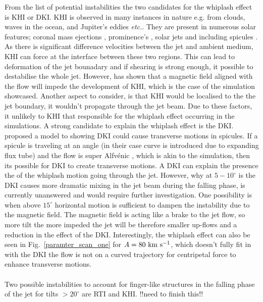 \documentclass[12pt]{ociamthesis}
\newcommand{\Alfvenic}{Alfv\'{e}nic }
\newcommand{\kms}{~\rm{km ~s^{-1}}}
\newcommand{\np}{\\ \\}
\newcommand{\degs}{^{\circ}}
\begin{document}
From the list of potential instabilities the two candidates for the whiplash effect is KHI or DKI. KHI is observed in many instances in nature e.g. from clouds, waves in the ocean, and Jupiter's eddies \textit{etc.}.  They are present in numerous solar features; coronal mass ejections \citep{Foullon2011ApJ729L8F, Foullon2013ApJ767170F}, prominence's \citep{Berger2010ApJ7161288B, Ryutova2010SoPh26775R}, solar jets \citep{Filippov2015MNRAS4511117F,Li2018NatSR88136L}  and including spicules \citep{Kuridze2016ApJ830133K, Antolin2018ApJ85644A}. As there is significant difference velocities between the jet and ambient medium, KHI can force at the interface between these two regions. This can lead to deformation of the jet bounadary and if shearing is strong enough, it possible to destabilise the whole jet. However,  \cite{Chandrasekhar1961hhsbookC} has shown that a magnetic field aligned with the flow will impede the development of KHI, which is the case of the simulation showcased. Another aspect to consider, is that KHI would be localised to the the jet boundary, it wouldn't propagate through the jet beam. Due to these factors, it unlikely to KHI that responsible for the whiplash effect occurring in the simulations. A strong candidate to explain the whiplash effect is the DKI. \cite{Zaqarashvili2020ApJ893L46Z} proposed a model to showing DKI could cause transverse motions in spicules. If a spicule is traveling at an angle (in their case curve is introduced due to expanding flux tube) and the flow is super \Alfvenic, which is akin to the simulation, then its possible for DKI to create transverse motions. A DKI can explain the presence the of the whiplash motion going through the jet. However, why at $5-10\degs$ is the DKI causes more dramatic mixing in the jet beam during the falling phase, is currently unanswered and would require further investigation. One possibility is when above $15^{\circ}$ horizontal motion is sufficient to dampen the instability due to the magnetic field. The magnetic field is acting like a brake to the jet flow, so more tilt the more impeded the jet will be therefore smaller up-flows and a reduction in the effect of the DKI. Interestingly, the whiplash effect can also be seen in Fig.~\ref{paramter_scan_one} for $A=80 \kms$, which doesn't fully fit in with the DKI the flow is not on a curved trajectory for centripetal force to enhance transverse motions. \np
%
Two possible instabilities to account for finger-like structures in the falling phase of the jet for tilts $>20^{\circ}$ are RTI and KHI. !!need to finish this!!  \np
%
\end{document}
